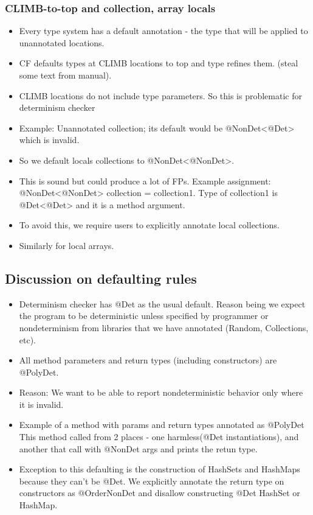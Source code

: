 \subsubsection{CLIMB-to-top and collection, array locals}

\begin{itemize}
	\item Every type system has a default annotation - the type that will be applied to unannotated locations.
	\item CF defaults types at CLIMB locations to top and type refines them. (steal some text from manual).
	\item CLIMB locations do not include type parameters. So this is problematic for determinism checker
	\item Example: Unannotated collection; its default would be @NonDet<@Det> which is invalid.
	\item So we default locals collections to @NonDet<@NonDet>. 
	\item This is sound but could produce a lot of FPs. Example assignment: @NonDet<@NonDet> collection = collection1.
	Type of collection1 is @Det<@Det> and it is a method argument.
	\item To avoid this, we require users to explicitly annotate local collections.
	\item Similarly for local arrays.
\end{itemize}

\subsection{Discussion on defaulting rules}

\begin{itemize}
	\item Determinism checker has @Det as the usual default. Reason being we expect the program to be 
	deterministic unless specified by programmer or nondeterminism from libraries that we have annotated (Random, Collections, etc).
	\item All method parameters and return types (including constructors) are @PolyDet.
	\item Reason: We want to be able to report nondeterministic behavior only where it is invalid.
	\item Example of a method with params and return types annotated as @PolyDet
	This method called from 2 places - one harmless(@Det instantiations), and another that call with @NonDet args and prints the retun type.
	\item Exception to this defaulting is the construction of HashSets and HashMaps because they can't be @Det.
	We explicitly annotate the return type on constructors as @OrderNonDet and disallow constructing @Det HashSet or HashMap.
\end{itemize}

